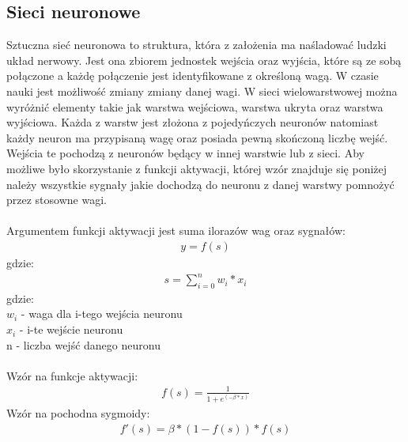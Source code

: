 \documentclass{classrep}
\begin{document}
    {
        \subsection{Sieci neuronowe}
        {
            Sztuczna sieć neuronowa to struktura, która z założenia ma naśladować ludzki
            układ nerwowy. Jest ona zbiorem jednostek wejścia oraz wyjścia, które są ze
            sobą połączone a każdę połączenie jest identyfikowane z określoną wagą.
            W czasie nauki jest możliwość zmiany zmiany danej wagi. W sieci wielowarstwowej
            można wyróżnić elementy takie jak warstwa wejściowa, warstwa ukryta oraz warstwa
            wyjściowa. Każda z warstw jest złożona z pojedyńczych neuronów natomiast każdy
            neuron ma przypisaną wagę oraz posiada pewną skończoną liczbę wejść. Wejścia te
            pochodzą z neuronów będący w innej warstwie lub z sieci. Aby możliwe było skorzystanie
            z funkcji aktywacji, której wzór znajduje się poniżej należy wszystkie sygnały
            jakie dochodzą do neuronu z danej warstwy pomnożyć przez stosowne wagi.\\\\
            Argumentem funkcji aktywacji jest suma ilorazów wag oraz sygnałów:
            \begin{align*}
                y=f(s)
            \end{align*}
            gdzie:
            \begin{align*}
                s=\displaystyle{\sum_{i=0}^{n} {w_i * x_i}}
            \end{align*}
            gdzie:\\
            $w_i$ - waga dla i-tego wejścia neuronu\\
            $x_i$ - i-te wejście neuronu\\
            n - liczba wejść danego neuronu\\\\
            Wzór na funkcje aktywacji:
            \begin{align*}
                f(s)=\frac{1}{1+ e^{(-\beta*x)}}
            \end{align*}
            Wzór na pochodna sygmoidy:
            \begin{align*}
                f'(s)=\beta*(1-f(s))*f(s)
            \end{align*}
        }

}
\end{document}
